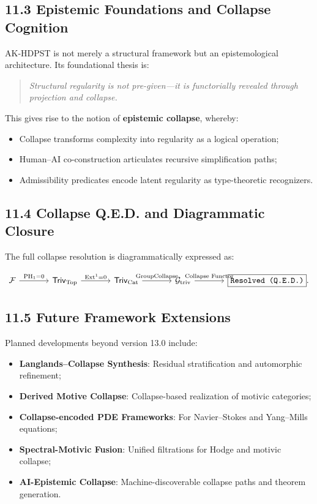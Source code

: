 \documentclass[11pt]{article}
\begin{document}
\subsection*{11.3 Epistemic Foundations and Collapse Cognition}

AK-HDPST is not merely a structural framework but an epistemological architecture. Its foundational thesis is:

\begin{quote}
\textit{Structural regularity is not pre-given—it is functorially revealed through projection and collapse.}
\end{quote}

This gives rise to the notion of \textbf{epistemic collapse}, whereby:

\begin{itemize}
    \item Collapse transforms complexity into regularity as a logical operation;
    \item Human–AI co-construction articulates recursive simplification paths;
    \item Admissibility predicates encode latent regularity as type-theoretic recognizers.
\end{itemize}

\subsection*{11.4 Collapse Q.E.D. and Diagrammatic Closure}

The full collapse resolution is diagrammatically expressed as:

\[
\begin{tikzcd}[column sep=large]
\mathcal{F} \arrow[r, "\mathrm{PH}_1 = 0"] 
& \mathsf{Triv}_{\mathrm{Top}} \arrow[r, "\mathrm{Ext}^1 = 0"] 
& \mathsf{Triv}_{\mathrm{Cat}} \arrow[r, "\mathrm{GroupCollapse}"] 
& \mathcal{G}_{\mathrm{triv}} \arrow[r, "\text{Collapse Functor}"] 
& \boxed{\texttt{Resolved (Q.E.D.)}}.
\end{tikzcd}
\]

\subsection*{11.5 Future Framework Extensions}

Planned developments beyond version 13.0 include:

\begin{itemize}
    \item \textbf{Langlands–Collapse Synthesis}: Residual stratification and automorphic refinement;
    \item \textbf{Derived Motive Collapse}: Collapse-based realization of motivic categories;
    \item \textbf{Collapse-encoded PDE Frameworks}: For Navier–Stokes and Yang–Mills equations;
    \item \textbf{Spectral-Motivic Fusion}: Unified filtrations for Hodge and motivic collapse;
    \item \textbf{AI-Epistemic Collapse}: Machine-discoverable collapse paths and theorem generation.
\end{itemize}
\end{document}
